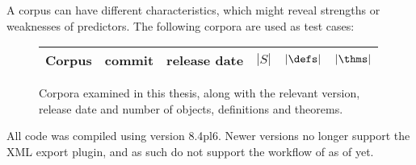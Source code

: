 A corpus can have different characteristics, which might reveal strengths or weaknesses of predictors.
The following corpora are used as test cases:

\begin{figure}[H]
  \begin{tabular}{lllrrr}
    Corpus & commit & release date & $|S|$ & $|\defs|$ & $|\thms|$ \\\hline
    
  \end{tabular}
  \caption{Corpora examined in this thesis, along with the relevant version, release date and number of objects, definitions and theorems.}
\end{figure}

All code was compiled using \coq version 8.4pl6.
Newer versions no longer support the XML export plugin, and as such do not support the workflow of \roerei as of yet.


